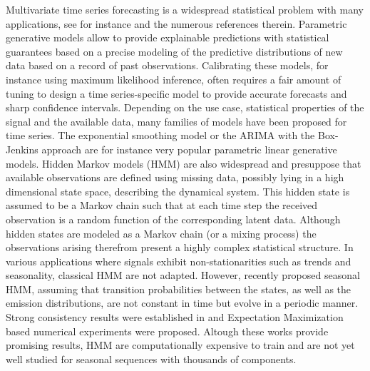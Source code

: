 \documentclass{article} %
\begin{document}
Multivariate time series forecasting is a widespread statistical problem with  many applications, see for instance \citep{sarkka2013bayesian, douc2014nonlinear, zucchini2017hidden} and the numerous references therein.
 Parametric generative models allow to provide explainable predictions with statistical guarantees based on a precise modeling of the predictive distributions of new data based on a record of past observations. %
Calibrating these models, for instance using maximum likelihood inference, often requires a fair amount of tuning to design a time series-specific model to provide  accurate forecasts and sharp confidence intervals.  Depending on the use case, statistical properties of the signal and the available data, many families of models have been proposed for time series.  The exponential smoothing model \citep{RePEc:inm:oropre:v:9:y:1961:i:5:p:673-685} or the ARIMA with the Box-Jenkins approach \citep{box2015time} are for instance very popular parametric linear generative models.  Hidden Markov models (HMM) are also widespread and presuppose that available observations are defined using missing data, possibly lying in a high dimensional state space, describing the dynamical system. This hidden state is assumed to be a Markov chain such that at each time step the received observation is a random function of the corresponding latent data.  Although hidden states are modeled as a Markov chain (or a mixing process)  the observations arising therefrom present a highly complex statistical structure. %
 In various applications where signals exhibit non-stationarities such as trends and seasonality, classical HMM are not adapted. However, \citep{touron2017modeling}  recently proposed seasonal HMM, assuming that transition probabilities between the states, as well as the emission distributions, are not constant in time but evolve in a periodic manner. Strong consistency results were established in \citep{touron2019consistency} and Expectation Maximization based numerical experiments were proposed.
Altough these works provide promising results, HMM are computationally expensive to train and are not yet well studied for seasonal  sequences with thousands of components.
 
\end{document}
